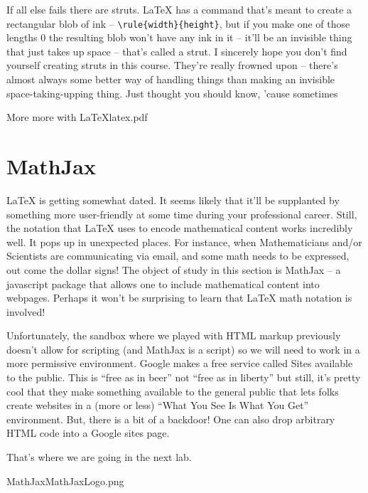 If all else fails there are struts.  \LaTeX{} has a command that's meant to create a rectangular blob of ink -- 
\verb+\rule{width}{height}+, but if you make one of those lengths $0$ the resulting blob won't have any ink in it -- it'll be an invisible thing that just takes up space -- that's called a strut.  I sincerely hope you don't find yourself creating struts in this course.  They're really frowned upon -- there's almost always some better way of handling things than making an invisible space-taking-upping thing.  Just thought you should know, 'cause sometimes\textellipsis

\clearpage
\begin{worksheet}{4}{More more with \LaTeX}{latex.pdf}

\end{worksheet}
\clearpage

\section{MathJax}
\label{sec:mathjax}

\LaTeX{} is getting somewhat dated.  It seems likely that it'll be supplanted by something more user-friendly at some time during your professional career.  Still, the notation that \LaTeX{} uses to encode mathematical content works incredibly well.  It pops up in unexpected places.  For instance, when Mathematicians and/or Scientists are communicating via email, and some math needs to be expressed, out come the dollar signs!  The object of study in this section is MathJax -- a javascript package that allows one to include mathematical content into webpages.  Perhaps it won't be surprising to learn that \LaTeX{} math notation is involved!

Unfortunately, the sandbox where we played with HTML markup previously doesn't allow for scripting (and MathJax is a script) so we will need to work in a more permissive environment.  Google makes a free service called Sites available to the public.  This is ``free as in beer'' not ``free as in liberty'' but still, it's pretty cool that they make something available to the general public that lets folks create websites in a (more or less) ``What You See Is What You Get'' environment.  But, there is a bit of a backdoor!  One can also drop arbitrary HTML code into a Google sites page.  

That's where we are going in the next lab.

\clearpage
\begin{worksheet}{5}{MathJax}{MathJaxLogo.png}

\end{worksheet}
\clearpage


